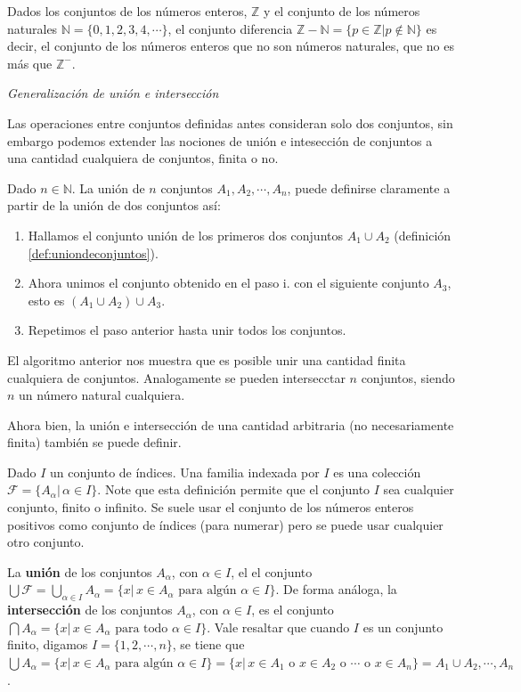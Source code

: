 \documentclass[12pt,]{krantz}
\theoremstyle{definition}
\theoremstyle{definition}
\theoremstyle{definition}
\theoremstyle{remark}
\let\BeginKnitrBlock\begin \let\EndKnitrBlock\end
\begin{document}
\BeginKnitrBlock{example}
\protect\hypertarget{exm:unnamed-chunk-15}{}{\label{exm:unnamed-chunk-15}
}Dados los conjuntos de los números enteros, \(\mathbb{Z}\) y el
conjunto de los números naturales \(\mathbb{N}=\{0,1,2,3,4,\cdots \}\),
el conjunto diferencia
\(\mathbb{Z}-\mathbb{N}=\{p\in\mathbb{Z}| p\notin \mathbb{N} \}\) es
decir, el conjunto de los números enteros que no son números naturales,
que no es más que \(\mathbb{Z}^{-}\).
\EndKnitrBlock{example}

\emph{Generalización de unión e intersección}

Las operaciones entre conjuntos definidas antes consideran solo dos
conjuntos, sin embargo podemos extender las nociones de unión e
intesección de conjuntos a una cantidad cualquiera de conjuntos, finita
o no.

Dado \(n\in\mathbb{N}\). La unión de \(n\) conjuntos
\(A_{1}, A_{2},\cdots,A_{n}\), puede definirse claramente a partir de la
unión de dos conjuntos así:

\begin{enumerate}
\def\labelenumi{\roman{enumi})}
\item
  Hallamos el conjunto unión de los primeros dos conjuntos
  \(A_{1}\cup A_{2}\) (definición \ref{def:uniondeconjuntos}).
\item
  Ahora unimos el conjunto obtenido en el paso i. con el siguiente
  conjunto \(A_{3}\), esto es \((A_{1}\cup A_{2})\cup A_{3}\).
\item
  Repetimos el paso anterior hasta unir todos los conjuntos.
\end{enumerate}

El algoritmo anterior nos muestra que es posible unir una cantidad
finita cualquiera de conjuntos. Analogamente se pueden intersecctar
\(n\) conjuntos, siendo \(n\) un número natural cualquiera.

Ahora bien, la unión e intersección de una cantidad arbitraria (no
necesariamente finita) también se puede definir.

Dado \(I\) un conjunto de índices. Una familia indexada por \(I\) es una
colección \(\mathcal{F}=\{A_{\alpha} | \, \alpha\in I \}\). Note que
esta definición permite que el conjunto \(I\) sea cualquier conjunto,
finito o infinito. Se suele usar el conjunto de los números enteros
positivos como conjunto de índices (para numerar) pero se puede usar
cualquier otro conjunto.

La \textbf{unión} de los conjuntos \(A_{\alpha}\), con \(\alpha\in I\),
el el conjunto
\(\bigcup\mathcal{F}=\bigcup_{\alpha\in I} A_{\alpha}=\{x|\, x\in A_{\alpha} \mbox{ para algún } \alpha\in I \}\).
De forma análoga, la \textbf{intersección} de los conjuntos
\(A_{\alpha}\), con \(\alpha\in I\), es el conjunto
\(\bigcap A_{\alpha}=\{x|\, x\in A_{\alpha} \mbox{ para todo } \alpha\in I \}\).
Vale resaltar que cuando \(I\) es un conjunto finito, digamos
\(I=\{1,2,\cdots, n\}\), se tiene que
\(\bigcup A_{\alpha}=\{x|\, x\in A_{\alpha} \mbox{ para algún } \alpha\in I \}=\{x|\, x\in A_{1} \mbox{ o } x\in A_{2}\mbox{ o }\cdots \mbox{ o } x\in A_{n} \}=A_{1}\cup A_{2},\cdots , A_{n}\).
\end{document}
